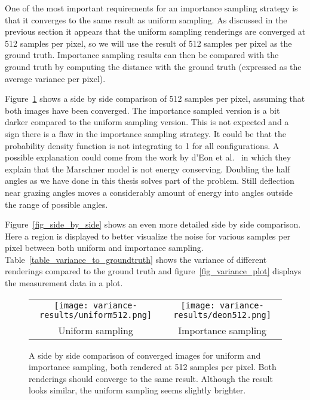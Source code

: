 \documentclass[11pt,a4paper]{report}
\begin{document}
One of the most important requirements for an importance sampling strategy is that it converges to the same result as uniform sampling. As discussed in the previous section it appears that the uniform sampling renderings are converged at 512 samples per pixel, so we will use the result of 512 samples per pixel as the ground truth. Importance sampling results can then be compared with the ground truth by computing the distance with the ground truth (expressed as the average variance per pixel).

Figure~\ref{fig_sidebyside_converged} shows a side by side comparison of 512 samples per pixel, assuming that both images have been converged. The importance sampled version is a bit darker compared to the uniform sampling version. This is not expected and a sign there is a flaw in the importance sampling strategy. It could be that the probability density function is not integrating to 1 for all configurations. A possible explanation could come from the work by d'Eon et al.~\cite{eon2011} in which they explain that the Marschner model is not energy conserving. Doubling the half angles as we have done in this thesis solves part of the problem. Still deflection near grazing angles moves a considerably amount of energy into angles outside the range of possible angles.

Figure~\ref{fig_side_by_side} shows an even more detailed side by side comparison. Here a region is displayed to better visualize the noise for various samples per pixel between both uniform and importance sampling. Table~\ref{table_variance_to_groundtruth} shows the variance of different renderings compared to the ground truth and figure~\ref{fig_variance_plot} displays the measurement data in a plot.


\begin{figure}
\begin{center}
\begin{tabular}{cc}
\texttt{[image: variance-results/uniform512.png]} & \texttt{[image: variance-results/deon512.png]} \\ 
Uniform sampling & Importance sampling \\
\end{tabular}
\end{center}
\caption{A side by side comparison of converged images for uniform and importance sampling, both rendered at 512 samples per pixel. Both renderings should converge to the same result. Although the result looks similar, the uniform sampling seems slightly brighter.}
\label{fig_sidebyside_converged}
\end{figure}
\end{document}
